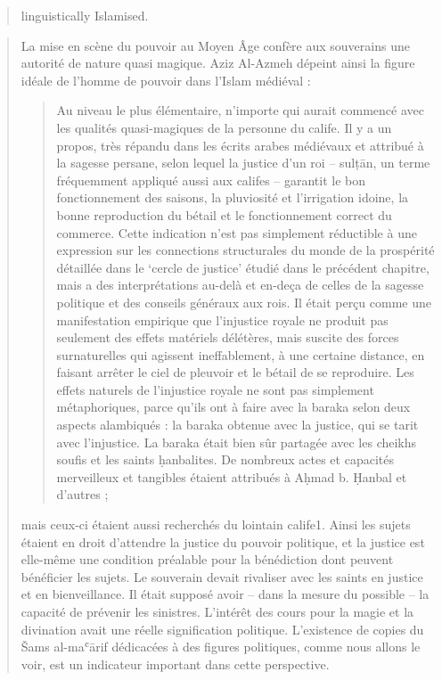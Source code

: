 \begin{quote}
linguistically Islamised.
 


\end{quote}


\begin{quote}
    La mise en scène du pouvoir au Moyen Âge confère aux souverains une autorité de nature quasi magique. Aziz Al-Azmeh dépeint ainsi la figure idéale de
l’homme de pouvoir dans l’Islam médiéval :
\begin{quote}
    Au niveau le plus élémentaire, n’importe qui aurait commencé avec les
qualités quasi-magiques de la personne du calife. Il y a un propos, très
répandu dans les écrits arabes médiévaux et attribué à la sagesse persane,
selon lequel la justice d’un roi – sulṭān, un terme fréquemment appliqué
aussi aux califes – garantit le bon fonctionnement des saisons, la
pluviosité et l’irrigation idoine, la bonne reproduction du bétail et le fonctionnement
correct du commerce. Cette indication n’est pas simplement
réductible à une expression sur les connections structurales du monde de
la prospérité détaillée dans le ‘cercle de justice’ étudié dans le précédent
chapitre, mais a des interprétations au-delà et en-deça de celles de la sagesse
politique et des conseils généraux aux rois. Il était perçu comme une
manifestation empirique que l’injustice royale ne produit pas seulement
des effets matériels délétères, mais suscite des forces surnaturelles qui
agissent ineffablement, à une certaine distance, en faisant arrêter le ciel
de pleuvoir et le bétail de se reproduire. Les effets naturels de l’injustice
royale ne sont pas simplement métaphoriques, parce qu’ils ont à faire 
 avec la baraka selon deux aspects alambiqués : la baraka obtenue avec la
justice, qui se tarit avec l’injustice. La baraka était bien sûr partagée avec
les cheikhs soufis et les saints ḥanbalites. De nombreux actes et capacités
merveilleux et tangibles étaient attribués à Aḥmad b. Ḥanbal et d’autres ;
\end{quote}


mais ceux-ci étaient aussi recherchés du lointain calife1.
Ainsi les sujets étaient en droit d’attendre la justice du pouvoir politique, et
la justice est elle-même une condition préalable pour la bénédiction dont
peuvent bénéficier les sujets. Le souverain devait rivaliser avec les saints en
justice et en bienveillance. Il était supposé avoir – dans la mesure du possible –
la capacité de prévenir les sinistres. L’intérêt des cours pour la magie et la divination
avait une réelle signification politique. L’existence de copies du Šams
al-maʿārif dédicacées à des figures politiques, comme nous allons le voir, est un
indicateur important dans cette perspective.\cite{coulon_magie_2017}
\end{quote}

